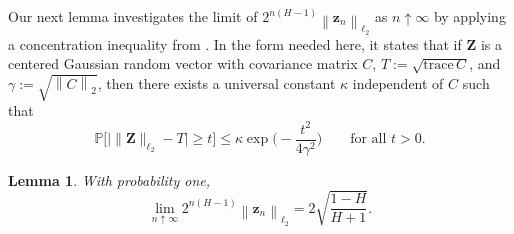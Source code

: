 \documentclass[12pt,reqno]{article}
\def\trace#1{\text{trace}\, #1}
\newcommand{\norm}[1]{\left\lVert {#1}\right\rVert}
\def\ua{\uparrow}
\numberwithin{equation}{section}
\newtheorem{lemma}[theorem]{Lemma}
\theoremstyle{definition}
\def\ua{\uparrow}
\newcommand{\bP}{\mathbb{P}}
\begin{document}
Our next lemma investigates the limit of $2^{n(H-1)}\norm{\bm z_n}_{\ell_2}$ as $n \ua \infty$ by applying a concentration inequality from \cite[Lemma 3.1]{BaudoinHairer}. In the form needed here, it states that if $\bm Z$ is a centered Gaussian random vector with covariance matrix $C$, $T:=\sqrt{\trace{C}}$, and $\gamma:=\sqrt{\norm{C}_2}$, then there exists a universal constant $\kappa$ independent of $C$ such that
\begin{equation}\label{concentration inequality}
\bP\Big[\big|\|\bm Z\|_{\ell_2}-T\big|\ge t\Big]\le \kappa\exp\Big(-\frac{t^2}{4\gamma^2}\Big)\qquad\text{for all $t>0$.}
\end{equation}

\begin{lemma}\label{lemma fbm strong}
	With probability one,
	\begin{equation*}
	\lim_{n \ua \infty}2^{n(H-1)}\norm{\bm z_n}_{\ell_2}=2\sqrt{\frac{1-H}{H+1}}.
	\end{equation*}
\end{lemma}
\end{document}
